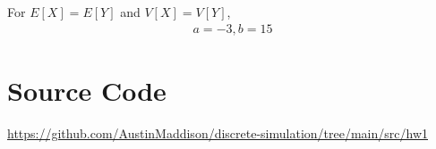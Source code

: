 \documentclass[twocolumn]{article}
\begin{document}
\vspace{-10pt}
For $E[X]=E[Y]$ and $V[X]=V[Y]$,
\vspace{-10pt}
\begin{align*}
a=-3, b=15
\end{align*}


\section*{Source Code}
\href{https://github.com/AustinMaddison/discrete-simulation/tree/main/src/hw1}{https://github.com/AustinMaddison/discrete-simulation/tree/main/src/hw1}

%
%
\end{document}
